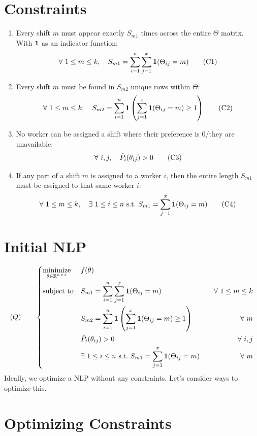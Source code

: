 \documentclass{article}
\begin{document}
\section*{Constraints}
\begin{enumerate}    
    \item Every shift $m$ must appear exactly $S_{m1}$ times across the entire $\Theta$ matrix. With $\mathbf1$ as an indicator function:
        \[\forall\ 1\le m\le k,\quad S_{m1}=\sum_{i=1}^n\sum_{j=1}^x\mb1(\Theta_{ij}=m)\hfil\tag{C1}\]
    \item Every shift $m$ must be found in $S_{m2}$ unique rows within $\Theta$:
        \[\forall\ 1\le m\le k,\quad S_{m2}=\sum_{i=1}^n\mb1\left(\sum_{j=1}^x\mb1(\Theta_{ij}=m)\ge1\right)\hfil\tag{C2}\]
    \item No worker can be assigned a shift where their preference is 0/they are unavailable:
        \[\forall\ i,j,\quad \hat P_i(\theta_{ij})>0\hfil\tag{C3}\]
    \item If any part of a shift $m$ is assigned to a worker $i$, then the entire length $S_{m1}$ must be assigned to that same worker $i$:
        \[\forall\ 1\le m\le k,\quad \exists\ 1\le i\le n\ \text{s.t.}\ S_{m1}=\sum_{j=1}^x\mb1(\Theta_{ij}=m)\hfil\tag{C4}\]
\end{enumerate}


\section*{Initial NLP}
\begin{equation*}
(Q)\qquad\left\{\begin{aligned}
    & \underset{ \mb \theta \in \R^{n\times x}}{\text{minimize}}
    & & f(\theta) \\
    & \text{subject to} && S_{m1}=\sum_{i=1}^n\sum_{j=1}^x\mb1(\Theta_{ij}=m)\quad &\forall\ 1\le m\le k\\
    &&& S_{m2}=\sum_{i=1}^n\mb1\left(\sum_{j=1}^x\mb1(\Theta_{ij}=m)\ge1\right)\quad &\forall\ m\\
    &&& \hat P_i(\theta_{ij})>0\quad &\forall\ i,j\\
    &&& \exists\ 1\le i\le n\ \text{s.t.}\ S_{m1}=\sum_{j=1}^x\mb1(\Theta_{ij}=m)\quad&\forall\ m
    \end{aligned}\right.
\end{equation*}
Ideally, we optimize a NLP without any constraints. Let's consider ways to optimize this.


\section*{Optimizing Constraints}
\end{document}
